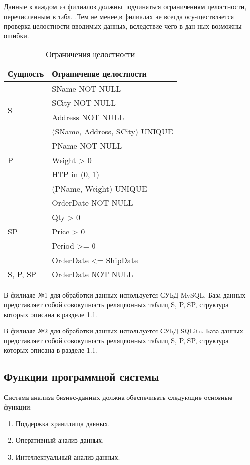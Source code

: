 Данные  в  каждом из  филиалов  должны  подчиняться ограничениям целостности, 
перечисленным в табл. .Тем не менее,в филиалах не всегда 
осу-ществляется проверка целостности вводимых данных, вследствие чего в дан-ных 
возможны ошибки.
\begin{table}[h]
	\caption{\space Ограничения целостности}
	\label{integrity}
	\begin{tabular}{|p{4cm}|p{8cm}|}
		\hline
		\textbf{Сущность} & \textbf{Ограничение целостности} \\
		\hline
		\multirow{4}{*}{S} 	& SName NOT NULL \\
					& SCity NOT NULL \\
					& Address NOT NULL \\
					& (SName, Address, SCity) UNIQUE \\
		\hline
		\multirow{3}{*}{P}	& PName NOT NULL\\
					& Weight > 0\\
					& HTP in (0, 1) \\
					& (PName, Weight) UNIQUE \\
		\hline
		\multirow{5}{*}{SP}	& OrderDate NOT NULL \\
					& Qty > 0 \\
					& Price > 0 \\
					& Period >= 0 \\
					& OrderDate <= ShipDate \\
		\hline
		S, P, SP		& OrderDate NOT NULL \\
		\hline
	\end{tabular}
\end{table}
В филиале №1 для обработки данных используется СУБД MySQL. База данных представляет собой совокупность реляционных таблиц S, P, SP, структура которых описана в разделе 1.1.\par
В филиале №2 для обработки данных используется СУБД SQLite. База данных представляет собой совокупность реляционных таблиц S, P, SP, структура которых описана в разделе 1.1.\par

\subsection{Функции программной системы}
Система анализа бизнес-данных должна обеспечивать следующие основные функции:
\begin{enumerate}
  \item Поддержка хранилища данных.
  \item Оперативный анализ данных.
  \item Интеллектуальный анализ данных.
\end{enumerate}

